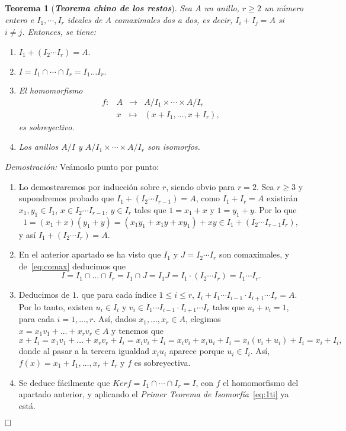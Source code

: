 \documentclass[12pt]{article}
\newtheorem{theorem}{Teorema}[section]
\begin{document}
\begin{theorem}[\textbf{\textit{Teorema chino de los restos}}]
Sea $A$ un anillo, $r \geq 2$ un número entero e $I_{1}, \cdots, I_{r}$ ideales de $A$ comaximales dos a dos, es decir, $I_{i} + I_{j} = A$ si $i \neq j$. Entonces, se tiene: \begin{enumerate}
\item $I_{1} + (I_{2} \cdots I_{r}) = A.$
\item $I = I_{1} \cap \cdots \cap I_{r} = I_{1} \ldots I_{r}.$
\item El homomorfismo $$\begin{array}{rccl}
f \colon &A&\longrightarrow &A/I_{1}\times \cdots \times A/I_{r} \\
&x& \longmapsto &(x + I_{1}, \ldots, x+ I_{r}),
\end{array}
$$ es sobreyectivo.
\item Los anillos $A/I$ y $A/I_{1}\times \cdots \times A/I_{r}$ son isomorfos.
\end{enumerate} 
\end{theorem}
\emph{Demostración: } Veámoslo punto por punto: \begin{enumerate}
\item Lo demostraremos por inducción sobre $r$, siendo obvio para $r = 2$. Sea $r \geq 3$ y supondremos probado que $I_{1} + (I_{2} \cdots I_{r-1}) = A$, como $I_{1} + I_{r} = A$ existirán $x_{1},y_{1} \in I_{1}$, $x \in I_{2} \cdots I_{r-1}$, $y \in I_{r}$ tales que $1 = x_{1} + x$ y $1 = y_{1} + y$. Por lo que $$1 = (x_{1} +x)(y_{1} + y)=(x_{1}y_{1} + x_{1}y + xy_{1}) + xy \in I_{1} + (I_{2} \cdots I_{r-1}I_{r}),$$ y así $I_{1} + (I_{2} \cdots I_{r}) = A.$
\item En el anterior apartado se ha visto que $I_{1}$ y $J= I_{2} \cdots I_{r}$ son comaximales, y de~\ref{eq:comax} deducimos que $$I = I_{1} \cap \ldots \cap I_{r} = I_{1} \cap J = I_{1}J = I_{1} \cdot (I_{2} \cdots I_{r}) = I_{1} \cdots I_{r}.$$
\item Deducimos de $1.$ que para cada índice $1 \leq i \leq r$, $I_{i} +I_{1}\cdots I_{i-1}\cdot I_{i+1} \cdots I_{r} = A.$ Por lo tanto, existen $u_{i} \in I_{i}$ y $v_{i} \in I_{1}\cdots I_{i-1}\cdot I_{i+1} \cdots I_{r}$ tales que $u_{i} + v_{i} = 1$, para cada $i = 1, \ldots, r$. Así, dados $x_{1}, \ldots, x_{r} \in A$, elegimos $x = x_{1}v_{1} + \ldots + x_{r}v_{r} \in A$ y tenemos que $$x + I_{i} = x_{1}v_{1} + \ldots + x_{r}v_{r} + I_{i} = x_{i}v_{i} + I_{i} =  x_{i}v_{i} +x_{i}u_{i} + I_{i} = x_{i}(v_{i} + u_{i}) + I_{i} = x_{i} + I_{i},$$ donde al pasar a la tercera igualdad $x_{i}u_{i}$ aparece porque $u_{i} \in I_{i}$. Así, $f(x) = x_{1} + I_{1}, \ldots, x_{r} + I_{r}$ y $f$ es sobreyectiva. 
\item Se deduce fácilmente que $Ker f = I_{1} \cap \cdots \cap I_{r} = I$, con $f$ el homomorfismo del apartado anterior, y aplicando el \textit{Primer Teorema de Isomorfía}~\ref{eq:1ti} ya está.
\end{enumerate}
$\hfill \square$
\end{document}
